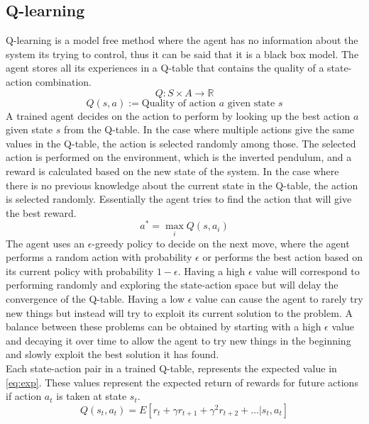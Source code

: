 \documentclass{LTHtwocol} %
\begin{document}
\subsection{Q-learning}
Q-learning is a model free method where the agent has no information about the system its trying to control, thus it can be said that it is a black box model.
The agent stores all its experiences in a Q-table that contains the quality of a state-action combination.
\begin{equation}
Q : S \times A  \to \mathbb{R}
\end{equation}
\[Q(s,a) := \text{Quality of action $a$ given state  $s$} \]
A trained agent decides on the action to perform by looking up the best action $a$ given state $s$ from the Q-table.
In the case where multiple actions give the same values in the Q-table, the action is selected randomly among those.
The selected action is performed on the environment, which is the inverted pendulum, and a reward is calculated based on the new state of the system.
In the case where there is no previous knowledge about the current state in the Q-table, the action is selected randomly.
Essentially the agent tries to find the action that will give the best reward.
\begin{equation}
 a^* = \max_i Q(s,a_i)
\end{equation}
The agent uses an $\epsilon$-greedy policy to decide on the next move, where the agent performs a random action with probability $\epsilon$ or performs the best action based on its current policy with probability $1-\epsilon$.
Having a high $\epsilon$ value will correspond to performing randomly and exploring the state-action space but will delay the convergence of the Q-table. 
Having a low $\epsilon$ value can cause the agent to rarely try new things but instead will try to exploit its current solution to the problem.
A balance between these problems can be obtained by starting with a high $\epsilon$ value and decaying it over time to allow the agent to try new things in the beginning and slowly exploit the best solution it has found. 
\\
Each state-action pair in a trained Q-table, represents the expected value in \eqref{eq:exp}. These values represent the expected return of rewards for future actions if action $a_t$ is taken at state $s_t$.
\begin{equation}
Q(s_t,a_t) = E[r_t + \gamma r_{t+1} + \gamma^2 r_{t+2} + \hdots | s_t,a_t] 
\label{eq:exp}
\end{equation}
\end{document}
